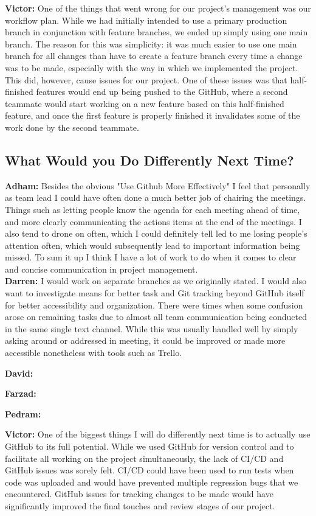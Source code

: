 \documentclass{article}
\begin{document}
\textbf{Victor:} One of the things that went wrong for our project's management was our workflow plan. While we had initially intended to use a primary production branch in 
conjunction with feature branches, we ended up simply using one main branch. The reason for this was simplicity: it was much easier to use one main branch for all changes than
have to create a feature branch every time a change was to be made, especially with the way in which we implemented the project. This did, however, cause issues for our project.
One of these issues was that half-finished features would end up being pushed to the GitHub, where a second teammate would start working on a new feature based on this 
half-finished feature, and once the first feature is properly finished it invalidates some of the work done by the second teammate.

\subsection{What Would you Do Differently Next Time?}

\textbf{Adham:} Besides the obvious "Use Github More Effectively" I feel that personally as team lead I could have often done a much better job of chairing the meetings. Things
such as letting people know the agenda for each meeting ahead of time, and more clearly communicating the actions items at the end of the meetings. I also tend to drone on 
often, which I could definitely tell led to me losing people's attention often, which would subsequently lead to important information being missed. To sum it up I think I have
a lot of work to do when it comes to clear and concise communication in project management.\\

\textbf{Darren:} I would work on separate branches as we originally stated. I would also want to investigate means for better task and Git tracking beyond GitHub itself for better accessibility and organization. There were times when some confusion arose on remaining tasks due to almost all team communication being conducted in the same single text channel. While this was usually handled well by simply asking around or addressed in meeting, it could be improved or made more accessible nonetheless with tools such as Trello.

\textbf{David:}

\textbf{Farzad:}

\textbf{Pedram:}

\textbf{Victor:} One of the biggest things I will do differently next time is to actually use GitHub to its full potential. While we used GitHub for version control and to 
facilitate all working on the project simultaneously, the lack of CI/CD and GitHub issues was sorely felt. CI/CD could have been used to run tests when code was uploaded and 
would have prevented multiple regression bugs that we encountered. GitHub issues for tracking changes to be made would have significantly improved the final touches and review 
stages of our project.
\end{document}
